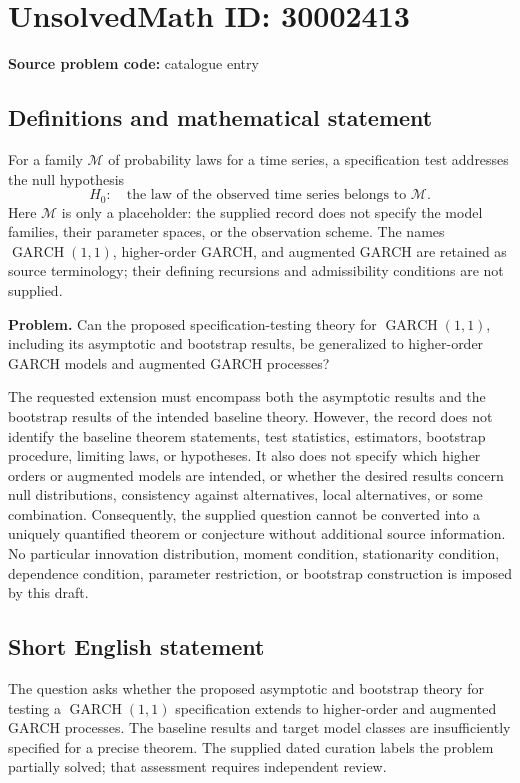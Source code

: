 \documentclass[11pt]{article}
\begin{document}
\section*{UnsolvedMath ID: 30002413}
\textbf{Source problem code:} catalogue entry
\subsection{Definitions and mathematical statement}
For a family \(\mathcal M\) of probability laws for a time series, a specification test addresses the null hypothesis
\[
H_0:\quad \text{the law of the observed time series belongs to }\mathcal M.
\]
Here \(\mathcal M\) is only a placeholder: the supplied record does not specify the model families, their parameter spaces, or the observation scheme. The names \(\operatorname{GARCH}(1,1)\), higher-order GARCH, and augmented GARCH are retained as source terminology; their defining recursions and admissibility conditions are not supplied.

\textbf{Problem.} Can the proposed specification-testing theory for \(\operatorname{GARCH}(1,1)\), including its asymptotic and bootstrap results, be generalized to higher-order GARCH models and augmented GARCH processes?

The requested extension must encompass both the asymptotic results and the bootstrap results of the intended baseline theory. However, the record does not identify the baseline theorem statements, test statistics, estimators, bootstrap procedure, limiting laws, or hypotheses. It also does not specify which higher orders or augmented models are intended, or whether the desired results concern null distributions, consistency against alternatives, local alternatives, or some combination. Consequently, the supplied question cannot be converted into a uniquely quantified theorem or conjecture without additional source information. No particular innovation distribution, moment condition, stationarity condition, dependence condition, parameter restriction, or bootstrap construction is imposed by this draft.
\subsection{Short English statement}
The question asks whether the proposed asymptotic and bootstrap theory for testing a \(\operatorname{GARCH}(1,1)\) specification extends to higher-order and augmented GARCH processes. The baseline results and target model classes are insufficiently specified for a precise theorem. The supplied dated curation labels the problem partially solved; that assessment requires independent review.
\end{document}
